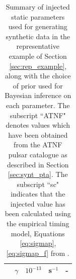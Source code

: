 \documentclass[fleqn,usenatbib,useAMS]{mnras}
\begin{document}
\begin{table}
{\begin{tabular}{lccll}
		& $\gamma$              & $10^{-13}$ & s$^{-1}$ & - \\
		\bottomrule
	\end{tabular}
}
	\caption{Summary of injected static parameters used for generating synthetic data in the representative example of Section \ref{sec:rep_example}, along with the choice of prior used for Bayesian inference on each parameter. The subscript ``ATNF" denotes values which have been obtained from the ATNF pulsar catalogue as described in Section \ref{sec:synt_pta}. The subscript ``sc" indicates that the injected value has been calculated using the empirical timing model, Equations \eqref{eq:sigmap}, \eqref{eq:sigmap_f} from \protect \cite{Shannon2010}.}
	\label{tab:parameters_and_priors}
\end{table}
\end{document}
